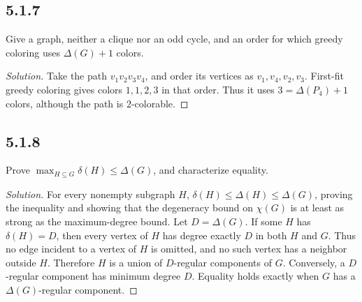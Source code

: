 \documentclass[12pt]{amsart}
\newenvironment{solution}{\begin{proof}[Solution]}{\end{proof}}
\begin{document}
    \subsection*{5.1.7} Give a graph, neither a clique nor an odd cycle, and an order for which greedy coloring uses $\Delta(G)+1$ colors.
    \begin{solution}Take the path $v_1v_2v_3v_4$, and order its vertices as $v_1,v_4,v_2,v_3$. First-fit greedy coloring gives colors $1,1,2,3$ in that order. Thus it uses $3=\Delta(P_4)+1$ colors, although the path is $2$-colorable.\end{solution}

    \subsection*{5.1.8} Prove $\max_{H\subseteq G}\delta(H)\le\Delta(G)$, and characterize equality.
    \begin{solution}For every nonempty subgraph $H$, $\delta(H)\le\Delta(H)\le\Delta(G)$, proving the inequality and showing that the degeneracy bound on $\chi(G)$ is at least as strong as the maximum-degree bound.
    Let $D=\Delta(G)$. If some $H$ has $\delta(H)=D$, then every vertex of $H$ has degree exactly $D$ in both $H$ and $G$. Thus no edge incident to a vertex of $H$ is omitted, and no such vertex has a neighbor outside $H$. Therefore $H$ is a union of $D$-regular components of $G$. Conversely, a $D$-regular component has minimum degree $D$. Equality holds exactly when $G$ has a $\Delta(G)$-regular component.\end{solution}
\end{document}
